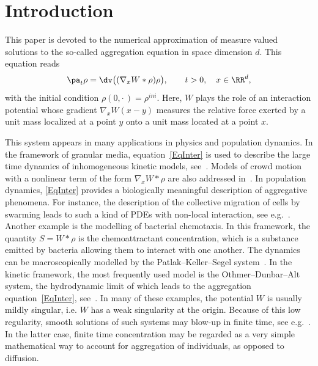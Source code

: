 \section{Introduction}

This paper is devoted to the numerical approximation of measure valued solutions to the so-called aggregation equation in space dimension $d$. This equation reads
\begin{equation}\label{EqInter}
\pa_t\rho = \dv\big((\nabla_x W*\rho) \rho\big), \qquad t>0,\quad x\in\RR^d,
\end{equation}
with the initial condition $\rho(0,{\cdot\,})=\rho^{ini}$. Here, $W$ plays the role of an interaction potential whose gradient $\nabla_x W(x-y)$ measures the relative force exerted by a unit mass localized at a point $y$ onto a unit mass located at a point $x$.

This system appears in many applications in physics and population dynamics. In the framework of granular media, equation~\eqref{EqInter} is used to describe the large time dynamics of inhomogeneous kinetic models, see~\cite{benedetto,CCV,Toscani}. Models of crowd motion with a nonlinear term of the form $\nabla_xW*\rho$ are also addressed in~\cite{pieton,pieton2}. In population dynamics, \eqref{EqInter} provides a biologically meaningful description of aggregative phenomena. For instance, the description of the collective migration of cells by swarming leads to such a kind of PDEs with non-local interaction, see e.g.~\cite{morale,okubo,topaz}. Another example is the modelling of bacterial chemotaxis. In this framework, the quantity $S=W*\rho$ is the chemoattractant concentration, which is a substance emitted by bacteria allowing them to interact with one another. The dynamics can be macroscopically modelled by the Patlak--Keller--Segel system~\cite{keller,patlack}. In the kinetic framework, the most frequently used model is the Othmer--Dunbar--Alt system, the hydrodynamic limit of which leads to the aggregation equation~\eqref{EqInter}, see~\cite{dolschmeis,filblaurpert,NoDEA}. In many of these examples, the potential $W$ is usually mildly singular, i.e. $W$ has a weak singularity at the origin. Because of this low regularity, smooth solutions of such systems may blow-up in finite time, see e.g.~\cite{BV,Bertozzi2,Carrillo,Li}. In the latter case, finite time concentration may be regarded as a very simple mathematical way to account for aggregation of individuals, as opposed to diffusion.

